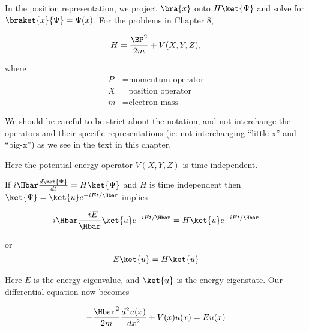 In the position representation, we project $\bra{x}$ onto $H \ket{\Psi}$ and solve for $\braket{x}{\Psi} = \Psi(x)$.  For the problems in Chapter 8,

\begin{equation}\label{eqn:PHY356Lecture9:3}
\begin{aligned}
H = \frac{\BP^2}{2m} + V(X,Y,Z),
\end{aligned}
\end{equation}

where
\begin{equation}\label{eqn:lecture9boundStates:60}
\begin{aligned}
P &= \text{momentum operator} \\
X &= \text{position operator} \\
m &= \text{electron mass}
\end{aligned}
\end{equation}

We should be careful to be strict about the notation, and not interchange the operators and their specific representations (ie: not interchanging ``little-x'' and ``big-x'') as we see in the text in this chapter.

Here the potential energy operator $V(X,Y,Z)$ is time independent.

If $i \Hbar \frac{d\ket{\Psi}}{dt} = H \ket{\Psi}$ and $H$ is time independent then $\ket{\Psi} = \ket{u} e^{-i E t/\Hbar}$ implies

\begin{equation}\label{eqn:lecture9boundStates:80}
\begin{aligned}
i \Hbar \frac{ -i E }{\Hbar} \ket{u} e^{-i E t/\Hbar} = H \ket{u} e^{-i E t/\Hbar}
\end{aligned}
\end{equation}

or
\begin{equation}\label{eqn:PHY356Lecture9:4}
\begin{aligned}
E \ket{u} = H \ket{u}
\end{aligned}
\end{equation}

Here $E$ is the energy eigenvalue, and $\ket{u}$ is the energy eigenstate.  Our differential equation now becomes

\begin{equation}\label{eqn:PHY356Lecture9:5}
\begin{aligned}
-\frac{\Hbar^2 }{2m} \frac{d^2 u(x)}{dx^2} + V(x) u(x) = E u(x)
\end{aligned}
\end{equation}

